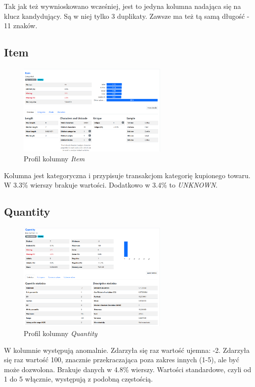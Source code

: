 \documentclass[a4paper,12pt]{article}
\begin{document}
Tak jak też wywnioskowano wcześniej, jest to jedyna kolumna nadająca się na klucz kandydujący. Są w niej tylko 3 duplikaty. Zawsze ma też tą samą długość - 11 znaków.

\subsection{Item}

\begin{figure}[H]
  \centering
  \includegraphics[width=0.65\textwidth]{images/py_2.png}
  \caption{Profil kolumny \textit{Item}}
\end{figure}

Kolumna jest kategoryczna i przypisuje transakcjom kategorię kupionego towaru. W 3.3\% wierszy brakuje wartości. Dodatkowo w 3.4\% to \textit{UNKNOWN}.

\subsection{Quantity}

\begin{figure}[H]
  \centering
  \includegraphics[width=0.65\textwidth]{images/py_3.png}
  \caption{Profil kolumny \textit{Quantity}}
\end{figure}

W kolumnie występują anomalnie. Zdarzyła się raz wartość ujemna: -2. Zdarzyła się raz wartość 100, znacznie przekraczająca poza zakres innych (1-5), ale być może dozwolona. Brakuje danych w 4.8\% wierszy. Wartości standardowe, czyli od 1 do 5 włącznie, występują z podobną częstością.
\end{document}
